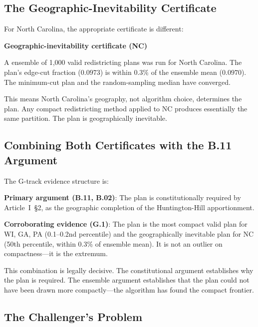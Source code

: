 \subsection{The Geographic-Inevitability Certificate}

For North Carolina, the appropriate certificate is different:

\begin{keybox}
\textbf{Geographic-inevitability certificate (NC)}

A \gc{} \recom{} ensemble of 1,000 valid redistricting plans was run for
North Carolina.  The \ar{} plan's edge-cut fraction ($0.0973$) is within
$0.3\%$ of the ensemble mean ($0.0970$).  The minimum-cut plan and the
random-sampling median have converged.

This means North Carolina's geography, not algorithm choice, determines
the plan.  Any compact redistricting method applied to NC produces
essentially the same partition.  The plan is geographically inevitable.
\end{keybox}

\subsection{Combining Both Certificates with the B.11 Argument}

The G-track evidence structure is:

\begin{keybox}
\textbf{Primary argument (B.11, B.02)}: The \ar{} plan is constitutionally
required by Article~I~\S2, as the geographic completion of the
Huntington-Hill apportionment.

\textbf{Corroborating evidence (G.1)}: The \ar{} plan is the most compact
valid plan for WI, GA, PA (0.1--0.2nd percentile) and the geographically
inevitable plan for NC (50th percentile, within 0.3\% of ensemble mean).
It is not an outlier on compactness---it is the extremum.
\end{keybox}

This combination is legally decisive.  The constitutional argument establishes
why the plan is required.  The ensemble argument establishes that the plan
could not have been drawn more compactly---the algorithm has found the compact
frontier.

\subsection{The Challenger's Problem}


